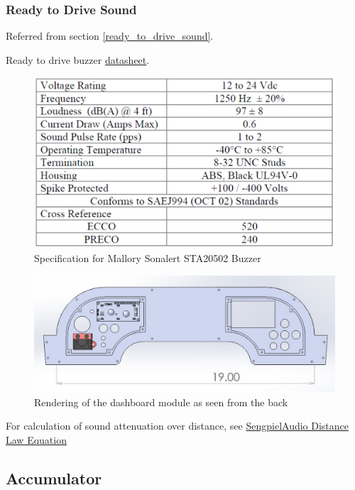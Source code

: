 \documentclass{article}
\begin{document}
\subsubsection{Ready to Drive Sound}\label{Ready to Drive}
Referred from section \ref{ready_to_drive_sound}.

Ready to drive buzzer \href{http://www.mallory-sonalert.com/specifications/STA20502.PDF}{datasheet}. \newline
\begin{figure}[H]
	\includegraphics[width=\linewidth]{Buzzer_Specifications}
	\caption{Specification for Mallory Sonalert STA20502 Buzzer}
\end{figure}

\begin{figure}[H]
	\includegraphics[width=\linewidth]{Dashboard_Rendering_Rear}
	\caption{Rendering of the dashboard module as seen from the back} 
    \label{fig:dashboard_Render}
\end{figure}

For calculation of sound attenuation over distance, see \href{http://www.sengpielaudio.com/calculator-distance.htm}{SengpielAudio Distance Law Equation}

\subsection{Accumulator}\label{appendix_accumulator}
\setcounter{subsubsection}{2}
\end{document}
